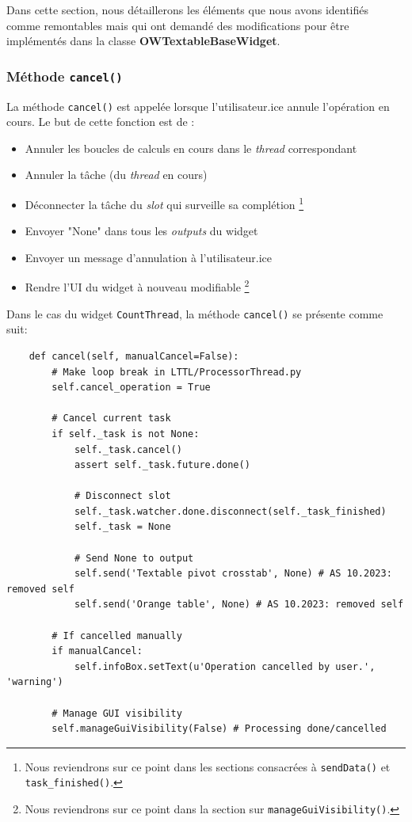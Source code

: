 \documentclass{article}
\begin{document}
Dans cette section, nous détaillerons les éléments que nous avons identifiés comme remontables mais qui ont demandé des modifications pour être implémentés dans la classe \textbf{OWTextableBaseWidget}.

\subsubsection{Méthode \texttt{cancel()}}

La méthode \texttt{cancel()} est appelée lorsque l'utilisateur.ice annule l'opération en cours. Le but de cette fonction est de :
\vspace{5mm}
\begin{itemize}
    \item Annuler les boucles de calculs en cours dans le \textit{thread} correspondant
    \item Annuler la tâche (du \textit{thread} en cours)
    \item Déconnecter la tâche du \textit{slot} qui surveille sa complétion \footnote{Nous reviendrons sur ce point dans les sections consacrées à \texttt{sendData()} et \texttt{task\_finished()}.}
    \item Envoyer "None" dans tous les \textit{outputs} du widget
    \item Envoyer un message d'annulation à l'utilisateur.ice
    \item Rendre l'UI du widget à nouveau modifiable \footnote{Nous reviendrons sur ce point dans la section sur \texttt{manageGuiVisibility()}.}
\end{itemize}
\vspace{5mm}
Dans le cas du widget \texttt{CountThread}, la méthode \texttt{cancel()} se présente comme suit:

\begin{verbatim}
    def cancel(self, manualCancel=False):
        # Make loop break in LTTL/ProcessorThread.py 
        self.cancel_operation = True

        # Cancel current task
        if self._task is not None:
            self._task.cancel()
            assert self._task.future.done()
            
            # Disconnect slot
            self._task.watcher.done.disconnect(self._task_finished)
            self._task = None
            
            # Send None to output 
            self.send('Textable pivot crosstab', None) # AS 10.2023: removed self
            self.send('Orange table', None) # AS 10.2023: removed self

        # If cancelled manually
        if manualCancel:
            self.infoBox.setText(u'Operation cancelled by user.', 'warning')

        # Manage GUI visibility
        self.manageGuiVisibility(False) # Processing done/cancelled
\end{verbatim}
\end{document}
